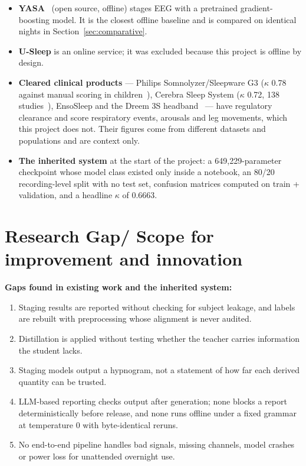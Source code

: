 \begin{itemize}
  \item \textbf{YASA}~\cite{vallat2021yasa} (open source, offline) stages EEG with a pretrained gradient-boosting
  model. It is the closest offline baseline and is compared on identical nights in Section~\ref{sec:comparative}.
  \item \textbf{U-Sleep} is an online service; it was excluded because this project is offline by design.
  \item \textbf{Cleared clinical products} --- Philips Somnolyzer/Sleepware G3 ($\kappa$ 0.78 against manual scoring
  in children~\cite{somnolyzer}), Cerebra Sleep System ($\kappa$ 0.72, 138 studies~\cite{cerebra}), EnsoSleep and the
  Dreem 3S headband~\cite{dreem} --- have regulatory clearance and score respiratory events, arousals and leg
  movements, which this project does not. Their figures come from different datasets and populations and are
  context only.
  \item \textbf{The inherited system} at the start of the project: a 649,229-parameter checkpoint whose model class
  existed only inside a notebook, an 80/20 recording-level split with no test set, confusion matrices computed on
  train + validation, and a headline $\kappa$ of 0.6663.
\end{itemize}

\section{Research Gap/ Scope for improvement and innovation}

\textbf{Gaps found in existing work and the inherited system:}
\begin{enumerate}
  \item Staging results are reported without checking for subject leakage, and labels are rebuilt with
  preprocessing whose alignment is never audited.
  \item Distillation is applied without testing whether the teacher carries information the student lacks.
  \item Staging models output a hypnogram, not a statement of how far each derived quantity can be trusted.
  \item LLM-based reporting checks output after generation; none blocks a report deterministically before release,
  and none runs offline under a fixed grammar at temperature 0 with byte-identical reruns.
  \item No end-to-end pipeline handles bad signals, missing channels, model crashes or power loss for unattended
  overnight use.
\end{enumerate}

